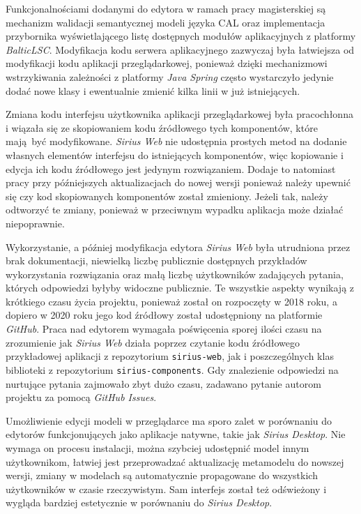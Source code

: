 Funkcjonalnościami dodanymi do edytora w ramach pracy magisterskiej są
mechanizm walidacji semantycznej modeli języka \gls{CAL} oraz implementacja
przybornika wyświetlającego listę dostępnych modułów aplikacyjnych z platformy
\emph{BalticLSC}. Modyfikacja kodu serwera aplikacyjnego zazwyczaj była
łatwiejsza od modyfikacji kodu aplikacji przeglądarkowej, ponieważ dzięki
mechanizmowi wstrzykiwania zależności z platformy \emph{Java Spring}
często wystarczyło jedynie dodać nowe klasy i ewentualnie zmienić kilka linii w
już istniejących.

Zmiana kodu interfejsu użytkownika aplikacji przeglądarkowej była pracochłonna
i wiązała się ze skopiowaniem kodu źródłowego tych komponentów, które mają być
modyfikowane. \emph{Sirius Web} nie udostępnia prostych metod na dodanie
własnych elementów interfejsu do istniejących komponentów, więc kopiowanie i
edycja ich kodu źródłowego jest jedynym rozwiązaniem. Dodaje to natomiast pracy
przy późniejszych aktualizacjach do nowej wersji ponieważ należy upewnić się
czy kod skopiowanych komponentów został zmieniony. Jeżeli tak, należy odtworzyć
te zmiany, ponieważ w przeciwnym wypadku aplikacja może działać niepoprawnie.

Wykorzystanie, a później modyfikacja edytora \emph{Sirius Web} była utrudniona
przez brak dokumentacji, niewielką liczbę publicznie dostępnych przykładów
wykorzystania rozwiązania oraz małą liczbę użytkowników zadających pytania,
których odpowiedzi byłyby widoczne publicznie. Te wszystkie aspekty wynikają z
krótkiego czasu życia projektu, ponieważ został on rozpoczęty w 2018 roku, a
dopiero w 2020 roku jego kod źródłowy został udostępniony na platformie
\emph{GitHub}. Praca nad edytorem wymagała poświęcenia sporej ilości czasu na
zrozumienie jak \emph{Sirius Web} działa poprzez czytanie kodu źródłowego
przykładowej aplikacji z repozytorium \texttt{sirius-web}, jak i poszczególnych
klas biblioteki z repozytorium \texttt{sirius-components}. Gdy znalezienie
odpowiedzi na nurtujące pytania zajmowało zbyt dużo czasu, zadawano pytanie
autorom projektu za pomocą \emph{GitHub Issues}.

Umożliwienie edycji modeli w przeglądarce ma sporo zalet w porównaniu do
edytorów funkcjonujących jako aplikacje natywne, takie jak \emph{Sirius
	Desktop}. Nie wymaga on procesu instalacji, można szybciej udostępnić
model innym użytkownikom, łatwiej jest przeprowadzać aktualizację metamodelu do
nowszej wersji, zmiany w modelach są automatycznie propagowane do wszystkich
użytkowników w czasie rzeczywistym. Sam interfejs został też odświeżony i
wygląda bardziej estetycznie w porównaniu do \emph{Sirius Desktop}.

